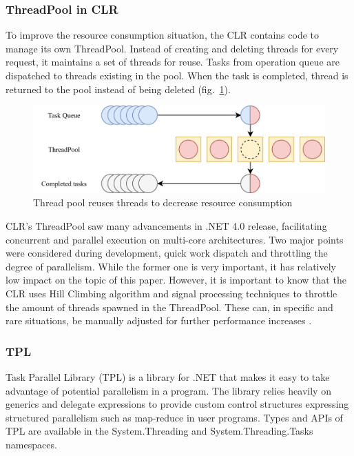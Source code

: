 \subsubsection{ThreadPool in CLR} 
To improve the resource consumption situation, the CLR contains code to manage its own ThreadPool. Instead of creating and deleting threads for every request, it maintains a set of threads for reuse. Tasks from operation queue are dispatched to threads existing in the pool. When the task is completed, thread is returned to the pool instead of being deleted (fig.~\ref{fig:threadpool}).

\begin{figure}[htb]
	\centering
		\includegraphics[scale=1.0]{figures02/threadpool.png}
		\caption{Thread pool reuses threads to decrease resource consumption}
		\label{fig:threadpool}
\end{figure}


CLR's ThreadPool saw many advancements in .NET 4.0 release, facilitating concurrent and parallel execution on multi-core architectures. Two major points were considered during development, quick work dispatch and throttling the degree of parallelism. While the former one is very important, it has relatively low impact on the topic of this paper. 
However, it is important to know that the CLR uses Hill Climbing algorithm and signal processing techniques to throttle the amount of threads spawned in the ThreadPool. These can, in specific and rare situations, be manually adjusted for further performance increases \cite{Fuentes2010}.

\subsubsection{TPL}
\label{sec:TPL}
Task Parallel Library (TPL) is a library for .NET that makes it easy to take advantage of potential parallelism in a program. The library relies heavily on generics and delegate expressions to provide custom control structures expressing structured parallelism such as map-reduce in user programs. Types and APIs of TPL are available in the System.Threading and System.Threading.Tasks namespaces.

